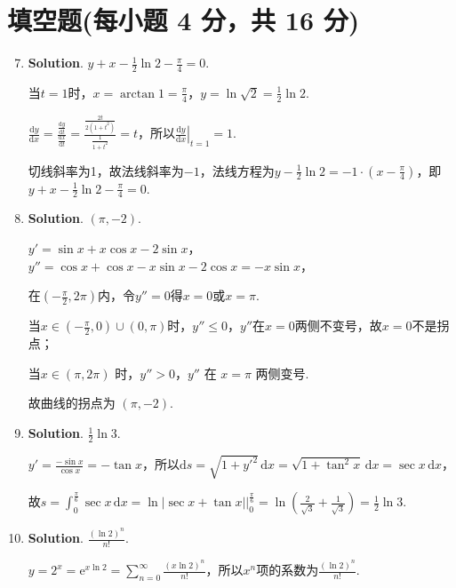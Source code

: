 \documentclass[../Main.tex]{subfiles}
\begin{document}
\section{填空题(每小题 4 分，共 16 分)}
\begin{enumerate}
    \setcounter{enumi}{6}
    \item \textbf{Solution}. $y+x-\frac{1}{2}\ln 2-\frac{\pi}{4}=0$.

          当$t=1$时，$x=\arctan 1=\frac{\pi}{4}$，$y=\ln\sqrt{2}=\frac{1}{2}\ln 2$.

          $\frac{\mathrm{d}y}{\mathrm{d}x}=\frac{\frac{\mathrm{d}y}{\mathrm{d}t}}{\frac{\mathrm{d}x}{\mathrm{d}t}}
              =\frac{\frac{2t}{2(1+t^{2})}}{\frac{1}{1+t^{2}}}=t$，所以$\left.\frac{\mathrm{d}y}{\mathrm{d}x}
              \right|_{t=1}=1$.

          切线斜率为1，故法线斜率为$-1$，法线方程为$y-\frac{1}{2}\ln 2=-1\cdot\left(x
              -\frac{\pi}{4}\right)$，即$y+x-\frac{1}{2}\ln 2-\frac{\pi}{4}=0$.

    \item \textbf{Solution}. $(\pi,-2)$.

          $y'=\sin x+x\cos x-2\sin x$，$y''=\cos x+\cos x-x\sin x-2\cos x=-x\sin x$，

          在$\left(-\frac{\pi}{2},2\pi\right)$内，令$y''=0$得$x=0$或$x=\pi$.

          当$x \in \left(-\frac{\pi}{2}, 0\right)\cup(0, \pi)$时，$y'' \leq 0$，$y''$在$x
              =0$两侧不变号，故$x=0$不是拐点；

          当$x \in (\pi, 2\pi)$ 时，$y'' > 0$，$y''$ 在 $x=\pi$ 两侧变号.

          故曲线的拐点为 $(\pi, -2)$.

    \item \textbf{Solution}. $\frac{1}{2}\ln 3$.

          $y'=\frac{-\sin x}{\cos x}=-\tan x$，所以$\mathrm{d}s=\sqrt{1+y'^{2}}\,\mathrm{d}
              x=\sqrt{1+\tan^{2}x}\,\mathrm{d}x=\sec x\,\mathrm{d}x$，

          故$s=\int_{0}^{\frac{\pi}{6}}\sec x\,\mathrm{d}x=\ln\left|\sec x+\tan x\right
              |\bigg|_{0}^{\frac{\pi}{6}}=\ln\left(\frac{2}{\sqrt{3}}+\frac{1}{\sqrt{3}}\right
              )=\frac{1}{2}\ln 3$.

    \item \textbf{Solution}. $\frac{(\ln 2)^{n}}{n!}$.

          $y=2^{x}=\mathrm{e}^{x\ln 2}=\sum_{n=0}^{\infty}\frac{(x\ln 2)^{n}}{n!}$，所以$x
                  ^{n}$项的系数为$\frac{(\ln 2)^{n}}{n!}$.
\end{enumerate}
\end{document}
